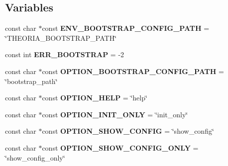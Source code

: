 \subsection*{Variables}
\begin{DoxyCompactItemize}
\item 
\hypertarget{namespacetheoria_a2a959c9e66a0135d5f99332642f6815e}{const char $\ast$const {\bfseries E\+N\+V\+\_\+\+B\+O\+O\+T\+S\+T\+R\+A\+P\+\_\+\+C\+O\+N\+F\+I\+G\+\_\+\+P\+A\+T\+H} = \char`\"{}T\+H\+E\+O\+R\+I\+A\+\_\+\+B\+O\+O\+T\+S\+T\+R\+A\+P\+\_\+\+P\+A\+T\+H\char`\"{}}\label{namespacetheoria_a2a959c9e66a0135d5f99332642f6815e}

\item 
\hypertarget{namespacetheoria_a4427bfe4c1771361b961393d52ae8cfd}{const int {\bfseries E\+R\+R\+\_\+\+B\+O\+O\+T\+S\+T\+R\+A\+P} = -\/2}\label{namespacetheoria_a4427bfe4c1771361b961393d52ae8cfd}

\item 
\hypertarget{namespacetheoria_a1583481acc0487d116375152e69e0d11}{const char $\ast$const {\bfseries O\+P\+T\+I\+O\+N\+\_\+\+B\+O\+O\+T\+S\+T\+R\+A\+P\+\_\+\+C\+O\+N\+F\+I\+G\+\_\+\+P\+A\+T\+H} = \char`\"{}bootstrap\+\_\+path\char`\"{}}\label{namespacetheoria_a1583481acc0487d116375152e69e0d11}

\item 
\hypertarget{namespacetheoria_abfa6e3d73339a08c27ffe3a931ecdd70}{const char $\ast$const {\bfseries O\+P\+T\+I\+O\+N\+\_\+\+H\+E\+L\+P} = \char`\"{}help\char`\"{}}\label{namespacetheoria_abfa6e3d73339a08c27ffe3a931ecdd70}

\item 
\hypertarget{namespacetheoria_a942035a17481d26684b988821d90f92e}{const char $\ast$const {\bfseries O\+P\+T\+I\+O\+N\+\_\+\+I\+N\+I\+T\+\_\+\+O\+N\+L\+Y} = \char`\"{}init\+\_\+only\char`\"{}}\label{namespacetheoria_a942035a17481d26684b988821d90f92e}

\item 
\hypertarget{namespacetheoria_a2c756adc3d2580641db20aa82736f78e}{const char $\ast$const {\bfseries O\+P\+T\+I\+O\+N\+\_\+\+S\+H\+O\+W\+\_\+\+C\+O\+N\+F\+I\+G} = \char`\"{}show\+\_\+config\char`\"{}}\label{namespacetheoria_a2c756adc3d2580641db20aa82736f78e}

\item 
\hypertarget{namespacetheoria_a7701495fc35e757c296eb826d4abc692}{const char $\ast$const {\bfseries O\+P\+T\+I\+O\+N\+\_\+\+S\+H\+O\+W\+\_\+\+C\+O\+N\+F\+I\+G\+\_\+\+O\+N\+L\+Y} = \char`\"{}show\+\_\+config\+\_\+only\char`\"{}}\label{namespacetheoria_a7701495fc35e757c296eb826d4abc692}

\end{DoxyCompactItemize}


